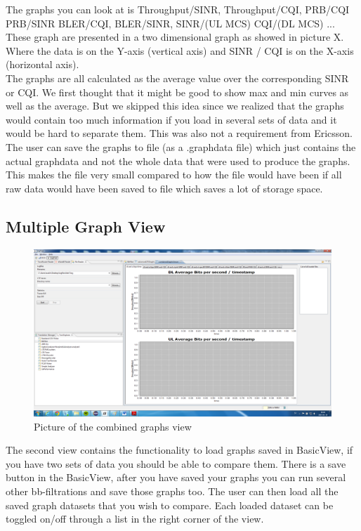 \documentclass[cropmarks, frame, english]{idamasterthesis}
\begin{document}
The graphs you can look at is Throughput/SINR, Throughput/CQI, PRB/CQI PRB/SINR BLER/CQI, BLER/SINR, SINR/(UL MCS) CQI/(DL MCS) ... These graph are presented in a two dimensional graph as showed in picture X. Where the data is on the Y-axis (vertical axis) and SINR / CQI is on the X-axis (horizontal axis). \\

The graphs are all calculated as the average value over the corresponding SINR or CQI. We first thought that it might be good to show max and min curves as well as the average. But we skipped this idea since we realized that the graphs would contain too much information if you load in several sets of data and it would be hard to separate them. This was also not a requirement from Ericsson. \\ 

The user can save the graphs  to file (as a .graphdata file) which just contains the actual graphdata and not the whole data that were used to produce the graphs. This makes the file very small compared to how the file would have been if all raw data would have been saved to file which saves a lot of storage space.


\subsection{Multiple Graph View}
	
\begin{figure}[H]
\includegraphics[width=\textwidth]{CombinedGraphsView}
\centering
\caption{Picture of the combined graphs view}
\end{figure}

The second view contains the functionality to load graphs saved in BasicView, if you have two sets of data you should be able to compare them. There is a save button in the BasicView, after you have saved your graphs you can run several other bb-filtrations and save those graphs too. The user can then load all the saved graph datasets that you wish to compare. Each loaded dataset can be toggled on/off through a list in the right corner of the view. 
\end{document}
